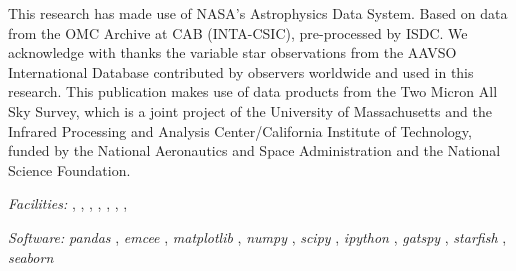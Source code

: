 \documentclass[twocolumn]{emulateapj}%
\newcommand{\project}[1]{\textsl{#1}}
\begin{document}
This research has made use of NASA's Astrophysics Data System.  
Based on data from the OMC Archive at CAB (INTA-CSIC), pre-processed by ISDC.
We acknowledge with thanks the variable star observations from the AAVSO International Database contributed by observers worldwide and used in this research.
This publication makes use of data products from the Two Micron All Sky Survey, which is a joint project of the University of Massachusetts and the Infrared Processing and Analysis Center/California Institute of Technology, funded by the National Aeronautics and Space Administration and the National Science Foundation.


{\it Facilities:} , , , , , , , 

{\it Software: } 
 \project{pandas} \citep{mckinney10},
 \project{emcee} \citep{foreman13},
 \project{matplotlib} \citep{hunter07},
 \project{numpy} \citep{vanderwalt11},
 \project{scipy} \citep{jones01},
 \project{ipython} \citep{perez07},
 \project{gatspy} \citep{JakeVanderplas2015},
 \project{starfish} \citep{czekala15},
 \project{seaborn} \citep{waskom14}

\clearpage



\end{document}
